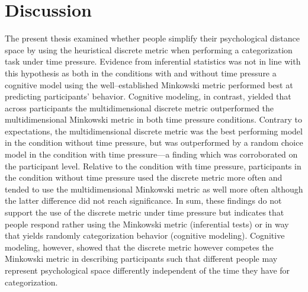 \documentclass[a4paper,man,natbib]{apa6}
\begin{document}
\section{Discussion}
The present thesis examined whether people simplify their psychological distance space by using the heuristical discrete metric when performing a categorization task under time pressure. Evidence from inferential statistics was not in line with this hypothesis as both in the conditions with and without time pressure a cognitive model using the well--established Minkowski metric performed best at predicting participants' behavior. Cognitive modeling, in contrast, yielded that across participants the multidimensional discrete metric outperformed the multidimensional Minkowski metric in both time pressure conditions. Contrary to expectations, the multidimensional discrete metric was the best performing model in the condition without time pressure, but was outperformed by a random choice model in the condition with time pressure---a finding which was corroborated on the participant level. Relative to the condition with time pressure, participants in the condition without time pressure used the discrete metric more often and tended to use the multidimensional Minkowski metric as well more often although the latter difference did not reach significance. In sum, these findings do not support the use of the discrete metric under time pressure but indicates that people respond rather using the Minkowski metric (inferential tests) or in way that yields randomly categorization behavior (cognitive modeling). Cognitive modeling, however, showed that the discrete metric however competes the Minkowski metric in describing participants such that different people may represent psychological space differently independent of the time they have for categorization.


\end{document}
